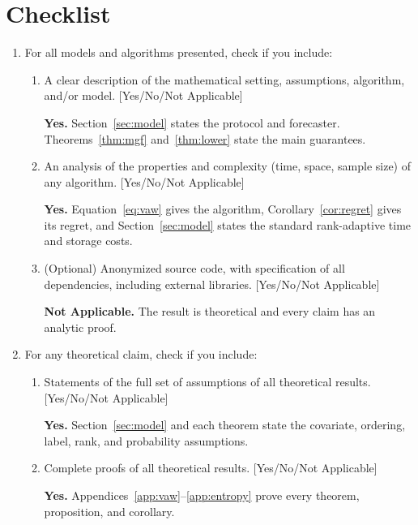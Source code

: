 \section*{Checklist}

\begingroup
\small
{}
\begin{enumerate}[leftmargin=*]

\item For all models and algorithms presented, check if you include:
  \begin{enumerate}
  \item A clear description of the mathematical setting, assumptions, algorithm, and/or model. [Yes/No/Not Applicable]

  \textbf{Yes.} Section~\ref{sec:model} states the protocol and forecaster. Theorems~\ref{thm:mgf} and~\ref{thm:lower} state the main guarantees.

  \item An analysis of the properties and complexity (time, space, sample size) of any algorithm. [Yes/No/Not Applicable]

  \textbf{Yes.} Equation~\eqref{eq:vaw} gives the algorithm, Corollary~\ref{cor:regret} gives its regret, and Section~\ref{sec:model} states the standard rank-adaptive time and storage costs.

  \item (Optional) Anonymized source code, with specification of all dependencies, including external libraries. [Yes/No/Not Applicable]

  \textbf{Not Applicable.} The result is theoretical and every claim has an analytic proof.
  \end{enumerate}

\item For any theoretical claim, check if you include:
  \begin{enumerate}
  \item Statements of the full set of assumptions of all theoretical results. [Yes/No/Not Applicable]

  \textbf{Yes.} Section~\ref{sec:model} and each theorem state the covariate, ordering, label, rank, and probability assumptions.

  \item Complete proofs of all theoretical results. [Yes/No/Not Applicable]

  \textbf{Yes.} Appendices~\ref{app:vaw}--\ref{app:entropy} prove every theorem, proposition, and corollary.


\end{enumerate}
\end{enumerate}
